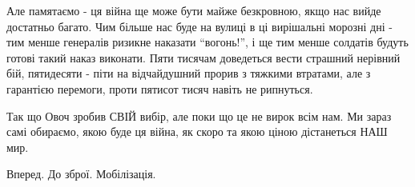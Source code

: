 Але памятаємо - ця війна ще може бути майже безкровною, якщо нас вийде
достатньо багато. Чим більше нас буде на вулиці в ці вирішальні морозні дні -
тим менше генералів ризикне наказати \enquote{вогонь!}, і ще тим менше солдатів будуть
готові такий наказ виконати. Пяти тисячам доведеться вести страшний нерівний
бій, пятидесяти - піти на відчайдушний прорив з тяжкими втратами, але з
гарантією перемоги, проти пятисот тисяч навіть не рипнуться.

Так що Овоч зробив СВІЙ вибір, але поки що це не вирок всім нам. Ми зараз самі
обираємо, якою буде ця війна, як скоро та якою ціною дістанеться НАШ мир.

Вперед. До зброї. Мобілізація.

